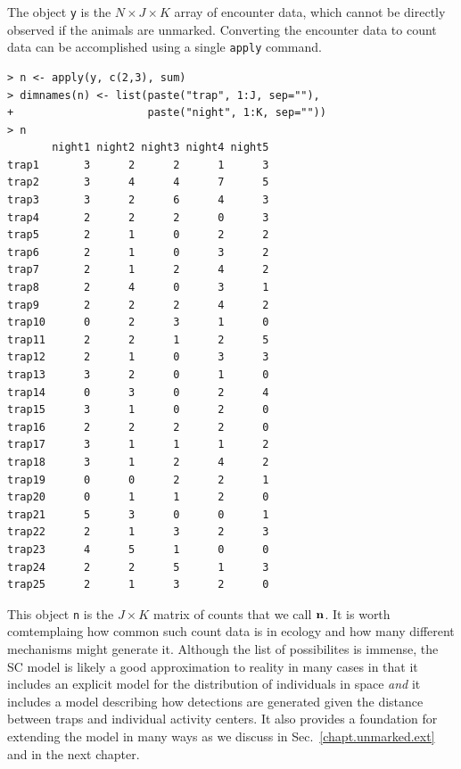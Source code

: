 The object \verb+y+ is the $N \times J \times K$ array of encounter
data, which cannot be directly observed if the animals are unmarked.
Converting the encounter data to count data can be accomplished using a single
\verb+apply+ command.
\begin{verbatim}
> n <- apply(y, c(2,3), sum)
> dimnames(n) <- list(paste("trap", 1:J, sep=""),
+                     paste("night", 1:K, sep=""))
> n
       night1 night2 night3 night4 night5
trap1       3      2      2      1      3
trap2       3      4      4      7      5
trap3       3      2      6      4      3
trap4       2      2      2      0      3
trap5       2      1      0      2      2
trap6       2      1      0      3      2
trap7       2      1      2      4      2
trap8       2      4      0      3      1
trap9       2      2      2      4      2
trap10      0      2      3      1      0
trap11      2      2      1      2      5
trap12      2      1      0      3      3
trap13      3      2      0      1      0
trap14      0      3      0      2      4
trap15      3      1      0      2      0
trap16      2      2      2      2      0
trap17      3      1      1      1      2
trap18      3      1      2      4      2
trap19      0      0      2      2      1
trap20      0      1      1      2      0
trap21      5      3      0      0      1
trap22      2      1      3      2      3
trap23      4      5      1      0      0
trap24      2      2      5      1      3
trap25      2      1      3      2      0
\end{verbatim}
This object \verb+n+ is the $J \times K$ matrix of counts that we call
$\bf n$. It is worth comtemplaing how common such count data is in
ecology and how many different mechanisms might generate it. Although
the list of possibilites is immense, the SC model is likely a good
approximation to reality in many cases in that it includes an explicit
model for the distribution of individuals in space \textit{and} it
includes a model describing how detections are generated given the
distance between traps and individual activity centers. It also
provides a foundation for extending the model in many ways as we
discuss in Sec.~\ref{chapt.unmarked.ext} and in the next chapter.


